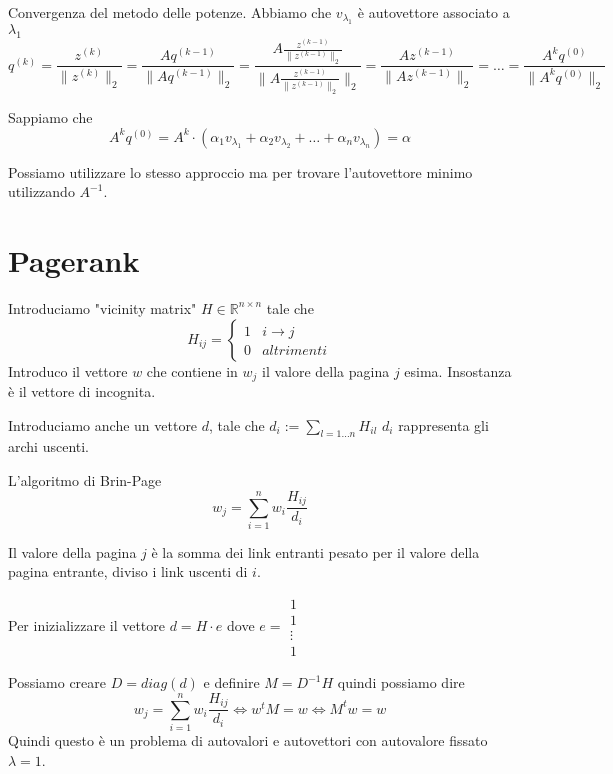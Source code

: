 Convergenza del metodo delle potenze.
Abbiamo che $v_{\lambda_1}$ è autovettore associato a $\lambda_1$
$$q^{(k)} = \frac{z^{(k)}}{\|z^{(k)}\|_2} = \frac{Aq^{(k-1)}}{\|Aq^{(k-1)}\|_2} =  \frac{A\frac{z^{(k-1)}}{\|z^{(k-1)}\|_2}}{\|A\frac{z^{(k-1)}}{\|z^{(k-1)}\|_2}\|_2} = \frac{Az^{(k-1)}}{\|Az^{(k-1)}\|_2} = \dots = \frac{A^kq^{(0)}}{\|A^kq^{(0)}\|_2}$$

Sappiamo che 
$$A^kq^{(0)} = A^k \cdot (\alpha_1v_{\lambda_1}+\alpha_2v_{\lambda_2} + \dots + \alpha_nv_{\lambda_n}) = \alpha$$

Possiamo utilizzare lo stesso approccio ma per trovare l'autovettore minimo utilizzando 
$A^{-1}$.

\section{Pagerank}
Introduciamo "vicinity matrix" $H\in \mathbb{R}^{n\times n}$ 
tale che 
$$H_{ij} = \begin{cases}
    1 & i\rightarrow j\\
    0 & altrimenti
\end{cases}$$
Introduco il vettore $w$ che contiene in $w_j$ il valore della pagina $j$ esima. 
Insostanza è il vettore di incognita.

Introduciamo anche un vettore $d$, tale che $d_i:=\sum_{l=1\dots n} H_{il}$ $d_i$ 
rappresenta gli archi uscenti.

L'algoritmo di Brin-Page
$$w_j = \sum_{i=1}^n w_i \frac{H_{ij}}{d_i}$$

Il valore della pagina $j$ è la somma dei link entranti pesato per il valore della 
pagina entrante, diviso i link uscenti di $i$.

Per inizializzare il vettore $d = H \cdot e $ dove 
$e = \begin{array}{c} 1 \\ 1 \\ \vdots \\ 1 \end{array}$

Possiamo creare $D = diag(d)$ e definire $M= D^{-1}H$
quindi possiamo dire
$$w_j = \sum_{i=1}^n w_i \frac{H_{ij}}{d_i} \iff w^t M = w \iff M^t w=w$$
Quindi questo è un problema di autovalori e autovettori con autovalore fissato $\lambda = 1$.

